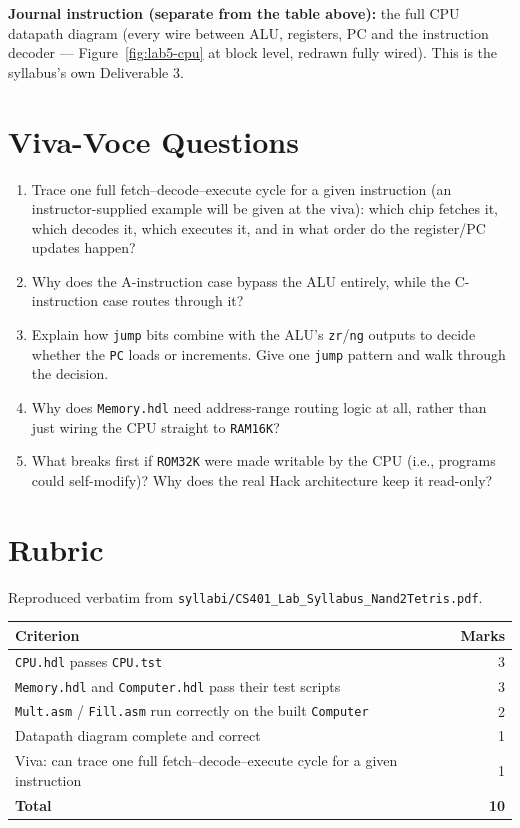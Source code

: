 \documentclass[11pt]{article}
\begin{document}
\noindent\textbf{Journal instruction (separate from the table above):} the full CPU datapath diagram (every wire between ALU, registers, PC and the instruction decoder --- Figure~\ref{fig:lab5-cpu} at block level, redrawn fully wired). This is the syllabus's own Deliverable 3.

\section{Viva-Voce Questions}

\begin{enumerate}
  \item Trace one full fetch--decode--execute cycle for a given instruction (an instructor-supplied example will be given at the viva): which chip fetches it, which decodes it, which executes it, and in what order do the register/PC updates happen?
  \item Why does the A-instruction case bypass the ALU entirely, while the C-instruction case routes through it?
  \item Explain how \texttt{jump} bits combine with the ALU's \texttt{zr}/\texttt{ng} outputs to decide whether the \texttt{PC} loads or increments. Give one \texttt{jump} pattern and walk through the decision.
  \item Why does \texttt{Memory.hdl} need address-range routing logic at all, rather than just wiring the CPU straight to \texttt{RAM16K}?
  \item What breaks first if \texttt{ROM32K} were made writable by the CPU (i.e., programs could self-modify)? Why does the real Hack architecture keep it read-only?
\end{enumerate}

\section{Rubric}

Reproduced verbatim from \texttt{syllabi/CS401\_Lab\_Syllabus\_Nand2Tetris.pdf}.

\begin{table}[h]
\centering
\begin{tabular}{@{}l r@{}}
\toprule
Criterion & Marks \\
\midrule
\texttt{CPU.hdl} passes \texttt{CPU.tst} & 3 \\
\texttt{Memory.hdl} and \texttt{Computer.hdl} pass their test scripts & 3 \\
\texttt{Mult.asm} / \texttt{Fill.asm} run correctly on the built \texttt{Computer} & 2 \\
Datapath diagram complete and correct & 1 \\
Viva: can trace one full fetch--decode--execute cycle for a given instruction & 1 \\
\midrule
\textbf{Total} & \textbf{10} \\
\bottomrule
\end{tabular}
\end{table}
\end{document}
